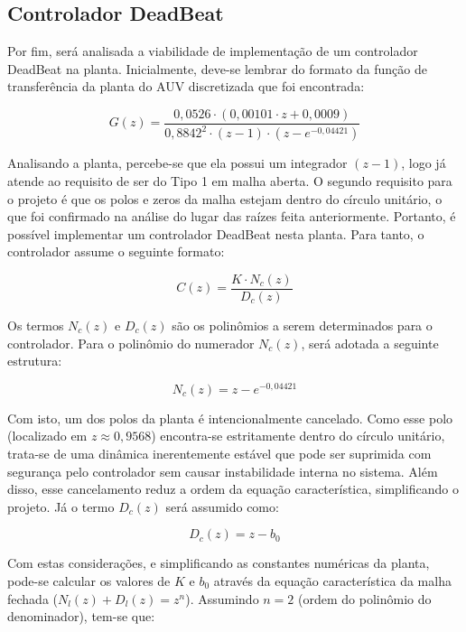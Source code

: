 \documentclass[12pt, a4paper]{article}
\begin{document}
		\subsection{Controlador DeadBeat}

			Por fim, será analisada a viabilidade de implementação de um controlador DeadBeat na planta. Inicialmente, deve-se lembrar do formato da função de transferência da planta do AUV discretizada que foi encontrada:

			\begin{equation}
				G(z) = \frac{0{,}0526 \cdot \left(0{,}00101 \cdot z+0{,}0009\right)}{0{,}8842^2 \cdot (z-1) \cdot (z-e^{-0{,}04421})}
			\end{equation}

			Analisando a planta, percebe-se que ela possui um integrador $(z - 1)$, logo já atende ao requisito de ser do Tipo 1 em malha aberta. O segundo requisito para o projeto é que os polos e zeros da malha estejam dentro do círculo unitário, o que foi confirmado na análise do lugar das raízes feita anteriormente. Portanto, é possível implementar um controlador DeadBeat nesta planta. Para tanto, o controlador assume o seguinte formato:

			\begin{equation}
				C(z) = \frac{K \cdot N_c(z)}{D_c(z)}
			\end{equation}

			Os termos $N_c(z)$ e $D_c(z)$ são os polinômios a serem determinados para o controlador. Para o polinômio do numerador $N_c(z)$, será adotada a seguinte estrutura:

			\begin{equation}
				N_c(z) = z - e^{-0{,}04421}
			\end{equation}

			Com isto, um dos polos da planta é intencionalmente cancelado. Como esse polo (localizado em $z \approx 0{,}9568$) encontra-se estritamente dentro do círculo unitário, trata-se de uma dinâmica inerentemente estável que pode ser suprimida com segurança pelo controlador sem causar instabilidade interna no sistema. Além disso, esse cancelamento reduz a ordem da equação característica, simplificando o projeto. Já o termo $D_c(z)$ será assumido como:

			\begin{equation}
				D_c(z) = z - b_0
			\end{equation}

			Com estas considerações, e simplificando as constantes numéricas da planta, pode-se calcular os valores de $K$ e $b_0$ através da equação característica da malha fechada ($N_l(z) + D_l(z) = z^n$). Assumindo $n = 2$ (ordem do polinômio do denominador), tem-se que:
\end{document}
